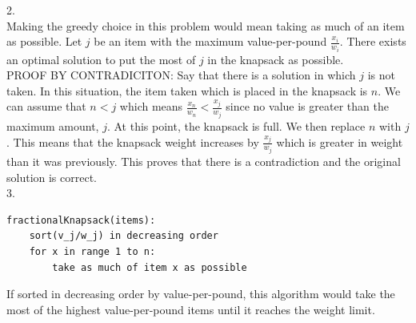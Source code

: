 \documentclass[11pt]{article}
\begin{document}
2. \\
Making the greedy choice in this problem would mean taking as much of an item as possible. Let $j$ be an item with the maximum value-per-pound $\frac{x_{i}}{w_{i}}$. There exists an optimal solution to put the most of $j$ in the knapsack as possible. \\ 
PROOF BY CONTRADICITON:
Say that there is a solution in which $j$ is not taken. In this situation, the item taken which is placed in the knapsack is $n$. We can assume that $n < j$ which means $\frac{x_{n}}{w_{n}} < \frac{x_{j}}{w_{j}}$ since no value is greater than the maximum amount, $j$. At this point, the knapsack is full. We then replace $n$ with $j$. This means that the knapsack weight increases by $\frac{x_{j}}{w_{j}}$ which is greater in weight than it was previously. This proves that there is a contradiction and the original solution is correct. \\

3. \\

\begin{lstlisting}
fractionalKnapsack(items):
	sort(v_j/w_j) in decreasing order
	for x in range 1 to n:
		take as much of item x as possible

\end{lstlisting}
 
If sorted in decreasing order by value-per-pound, this algorithm would take the most of the highest value-per-pound items until it reaches the weight limit. 


\newpage
\end{document}
